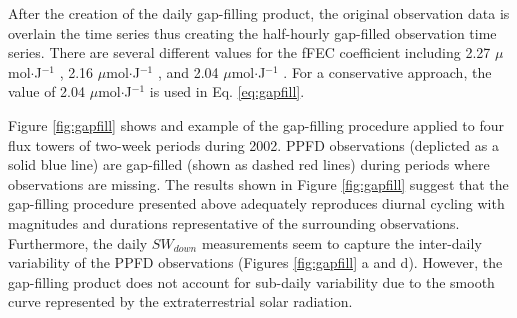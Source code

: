\noindent After the creation of the daily gap-filling product, the original observation data is overlain the time series thus creating the half-hourly gap-filled observation time series.  
There are several different values for the fFEC coefficient including 2.27 $\mu$mol$\cdot$J$^{-1}$ \parencite{prentice93}, 2.16 $\mu$mol$\cdot$J$^{-1}$ \parencite{ge11}, and 2.04 $\mu$mol$\cdot$J$^{-1}$ \parencite{meek84}. 
For a conservative approach, the value of 2.04 $\mu$mol$\cdot$J$^{-1}$ is used in Eq. \ref{eq:gapfill}.

Figure \ref{fig:gapfill} shows and example of the gap-filling procedure applied to four flux towers of two-week periods during 2002.  
PPFD observations (deplicted as a solid blue line) are gap-filled (shown as dashed red lines) during periods where observations are missing.  
The results shown in Figure \ref{fig:gapfill} suggest that the gap-filling procedure presented above adequately reproduces diurnal cycling with magnitudes and durations representative of the surrounding observations.  
Furthermore, the daily $SW_{down}$ measurements seem to capture the inter-daily variability of the PPFD observations (Figures \ref{fig:gapfill} a and d). 
However, the gap-filling product does not account for sub-daily variability due to the smooth curve represented by the extraterrestrial solar radiation.

